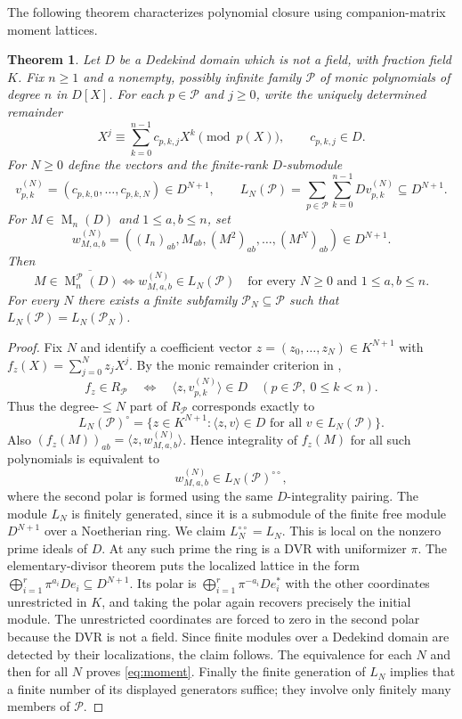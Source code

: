 \documentclass[11pt]{amsart}
\newtheorem{theorem}{Theorem}[section]
\theoremstyle{definition}
\theoremstyle{remark}
\newcommand{\Mat}{\operatorname{M}}
\begin{document}
The following theorem characterizes polynomial closure using companion-matrix moment lattices.
\begin{theorem}\label{thm:moment}
Let $D$ be a Dedekind domain which is not a field, with fraction field $K$.
Fix $n\ge1$ and a nonempty, possibly infinite family $\mathcal P$ of monic
polynomials of degree $n$ in $D[X]$.  For each $p\in\mathcal P$ and $j\ge0$,
write the uniquely determined remainder
\[
 X^j\equiv\sum_{k=0}^{n-1}c_{p,k,j}X^k\pmod{p(X)},
 \qquad c_{p,k,j}\in D.
\]
For $N\ge0$ define the vectors and the finite-rank $D$-submodule
\[
 v^{(N)}_{p,k}=(c_{p,k,0},\ldots,c_{p,k,N})\in D^{N+1},\qquad
 L_N(\mathcal P)=\sum_{p\in\mathcal P}\sum_{k=0}^{n-1}D v^{(N)}_{p,k}
 \subseteq D^{N+1}.
\]
For $M\in\Mat_n(D)$ and $1\le a,b\le n$, set
\[
 w^{(N)}_{M,a,b}=((I_n)_{ab},M_{ab},(M^2)_{ab},\ldots,(M^N)_{ab})
 \in D^{N+1}.
\]
Then
\begin{equation}\label{eq:moment}
M\in\overline{\Mat_n^{\mathcal P}(D)}
\iff w^{(N)}_{M,a,b}\in L_N(\mathcal P)
\quad\text{for every $N\ge0$ and $1\le a,b\le n$.}
\end{equation}
For every $N$ there exists a \emph{finite} subfamily
$\mathcal P_N\subseteq\mathcal P$ such that
$L_N(\mathcal P)=L_N(\mathcal P_N)$.
\end{theorem}

\begin{proof}
Fix $N$ and identify a coefficient vector
$z=(z_0,\ldots,z_N)\in K^{N+1}$ with $f_z(X)=\sum_{j=0}^Nz_jX^j$.
By the monic remainder criterion in \cite[Proposition 2.1]{Peruginelli2014},
\[
 f_z\in R_{\mathcal P}\quad\Longleftrightarrow\quad
 \langle z,v^{(N)}_{p,k}\rangle\in D
 \quad(p\in\mathcal P,\ 0\le k<n).
\]
Thus the degree-$\le N$ part of $R_{\mathcal P}$ corresponds exactly to
\[
 L_N(\mathcal P)^\circ
 =\{z\in K^{N+1}:\langle z,v\rangle\in D\text{ for all }v\in L_N(\mathcal P)\}.
\]
Also $(f_z(M))_{ab}=\langle z,w^{(N)}_{M,a,b}\rangle$.
Hence integrality of $f_z(M)$ for all such polynomials is equivalent to
\[
 w^{(N)}_{M,a,b}\in L_N(\mathcal P)^{\circ\circ},
\]
where the second polar is formed using the same $D$-integrality pairing.
The module $L_N$ is finitely generated, since it is a submodule of the
finite free module $D^{N+1}$ over a Noetherian ring.
We claim $L_N^{\circ\circ}=L_N$.  This is local on the nonzero prime
ideals of $D$.  At any such prime the ring is a DVR with uniformizer
$\pi$.  The elementary-divisor theorem puts the localized lattice in
the form $\bigoplus_{i=1}^r\pi^{a_i}De_i\subseteq D^{N+1}$.
Its polar is $\bigoplus_{i=1}^r\pi^{-a_i}De_i^*$ with the other
coordinates unrestricted in $K$, and taking the polar again recovers
precisely the initial module.  The unrestricted coordinates are
forced to zero in the second polar because the DVR is not a field.
Since finite modules over a Dedekind domain are detected by their
localizations, the claim follows.  The equivalence for each $N$
and then for all $N$ proves \eqref{eq:moment}.
Finally the finite generation of $L_N$ implies that a finite number
of its displayed generators suffice; they involve only finitely many
members of $\mathcal P$.
\end{proof}
\end{document}
